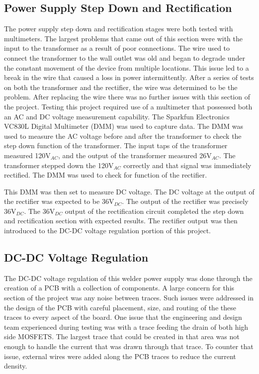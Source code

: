 \documentclass[11pt]{article}
\begin{document}
    \subsection{Power Supply Step Down and Rectification}
    The power supply step down and rectification stages were both tested with multimeters. The largest problems that came out of this section were with the input to the transformer as a result of poor connections. The wire used to connect the transformer to the wall outlet was old and began to degrade under the constant movement of the device from multiple locations. This issue led to a break in the wire that caused a loss in power intermittently. After a series of tests on both the transformer and the rectifier, the wire was determined to be the problem. After replacing the wire there was no further issues with this section of the project. Testing this project required use of a multimeter that possessed both an AC and DC voltage measurement capability. The Sparkfun Electronics VC830L Digital Multimeter (DMM) was used to capture data. The DMM was used to measure the AC voltage before and after the transformer to check the step down function of the transformer. The input taps of the transformer measured 120V$_{AC}$, and the output of the transformer measured 26V$_{AC}$. The transformer stepped down the 120V$_{AC}$ correctly and that signal was immediately rectified. The DMM was used to check for function of the rectifier.
    
    This DMM was then set to measure DC voltage. The DC voltage at the output of the rectifier was expected to be 36V$_{DC}$. The output of the rectifier was precisely 36V$_{DC}$. The 36V$_{DC}$ output of the rectification circuit completed the step down and rectification section with expected results. The rectifier output was then introduced to the DC-DC voltage regulation portion of this project. 
    
        
    \subsection{DC-DC Voltage Regulation}
       The DC-DC voltage regulation of this welder power supply was done through the creation of a PCB with a collection of components. A large concern for this section of the project was any noise between traces. Such issues were addressed in the design of the PCB with careful placement, size, and routing of the these traces to every aspect of the board. One issue that the engineering and design team experienced during testing was with a trace feeding the drain of both high side MOSFETS. The largest trace that could be created in that area was not enough to handle the current that was drawn through that trace. To counter that issue, external wires were added along the PCB traces to reduce the current density. 
       
\end{document}
